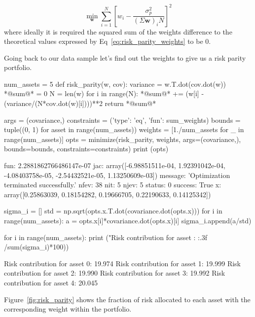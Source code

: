 \begin{equation} 
\underset{\mathbf{w}}{\min } \sum _{i=1}^{N}\left[w_{i}-{\frac {\sigma_p^{2}}{(\Sigma \mathbf{w})_{i}N}}\right]^{2} 
\end{equation}
\noindent
where ideally it is required the squared sum of the weights difference to the theoretical values expressed by Eq~\ref{eq:risk_parity_weights} to be 0.

Going back to our data sample let's find out the weights to give us a risk parity portfolio.

\begin{ipython}
num_assets = 5
def risk_parity(w, cov):
    variance = w.T.dot(cov.dot(w))
    *@sum@* = 0
    N = len(w)
    for i in range(N):
        *@sum@* += (w[i] - (variance/(N*cov.dot(w)[i])))**2
    return *@sum@*
	
args = (covariance,)
constraints = ({'type': 'eq', 'fun': sum_weights})
bounds = tuple((0, 1) for asset in range(num_assets))
weights = [1./num_assets for _ in range(num_assets)]
opts = minimize(risk_parity, weights, args=(covariance,),
                bounds=bounds, constraints=constraints)
print (opts)
\end{ipython}
\begin{ioutput}
    fun: 2.2881862766486147e-07
    jac: array([-6.98851511e-04,  1.92391042e-04, -4.08403758e-05, 
                -2.54432521e-05,  1.13250609e-03])
message: 'Optimization terminated successfully.'
   nfev: 38
    nit: 5
   njev: 5
 status: 0
success: True
x: array([0.25863039, 0.18154282, 0.19666705, 0.22190633, 
          0.14125342])
\end{ioutput}

\begin{ipython}
sigma_i = []
std = np.sqrt(opts.x.T.dot(covariance.dot(opts.x)))
for i in range(num_assets):
    a = opts.x[i]*covariance.dot(opts.x)[i]
	sigma_i.append(a/std)
	
for i in range(num_assets):
    print ("Risk contribution for asset {}: {:.3f}%
                                                            /sum(sigma_i)*100))
\end{ipython}
\begin{ioutput}
Risk contribution for asset 0: 19.974%
Risk contribution for asset 1: 19.999%
Risk contribution for asset 2: 19.990%
Risk contribution for asset 3: 19.992%
Risk contribution for asset 4: 20.045%
\end{ioutput}

Figure~\ref{fig:risk_parity} shows the fraction of risk allocated to each asset with the corresponding weight within the portfolio.

